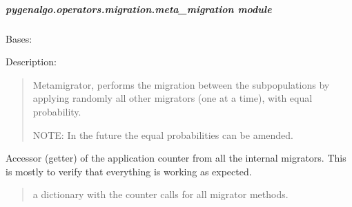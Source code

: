 \documentclass[letterpaper,10pt,english]{sphinxmanual}
\begin{document}
\subparagraph{pygenalgo.operators.migration.meta\_migration module}
\label{\detokenize{pygenalgo.operators.migration:module-pygenalgo.operators.migration.meta_migration}}\label{\detokenize{pygenalgo.operators.migration:pygenalgo-operators-migration-meta-migration-module}}

\begin{fulllineitems}
\label{\detokenize{pygenalgo.operators.migration:pygenalgo.operators.migration.meta_migration.MetaMigration}}
\pysigstartsignatures
\pysiglinewithargsret
{}
{}
{}
\pysigstopsignatures
\sphinxAtStartPar
Bases: {\hyperref[\detokenize{pygenalgo.operators.migration:pygenalgo.operators.migration.migration_operator.MigrationOperator}]{}}

\sphinxAtStartPar
Description:
\begin{quote}

\sphinxAtStartPar
Meta\sphinxhyphen{}migrator, performs the migration between the subpopulations by applying
randomly all other migrators (one at a time), with equal probability.

\sphinxAtStartPar
NOTE: In the future the equal probabilities can be amended.
\end{quote}

\begin{fulllineitems}
\label{\detokenize{pygenalgo.operators.migration:pygenalgo.operators.migration.meta_migration.MetaMigration.all_counters}}
\pysigstartsignatures
\pysigline
{}
\pysigstopsignatures
\sphinxAtStartPar
Accessor (getter) of the application counter from all the internal migrators.
This is mostly to verify that everything is working as expected.
\begin{quote}\begin{description}
\sphinxAtStartPar
a dictionary with the counter calls for all migrator methods.


\end{description}
\end{quote}
\end{fulllineitems}
\end{fulllineitems}
\end{document}
